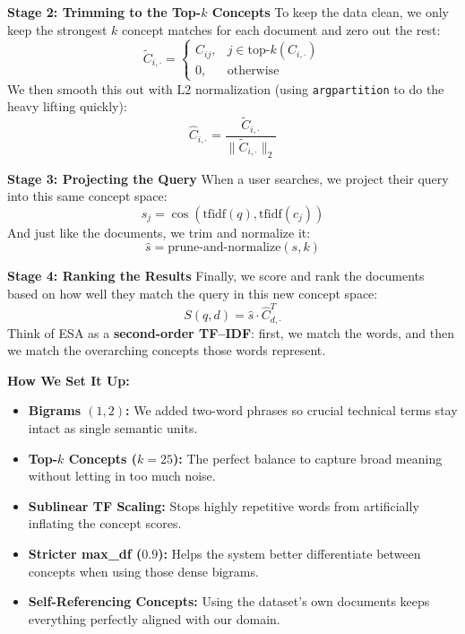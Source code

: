 \documentclass[runningheads]{llncs}
\begin{document}
\noindent\textbf{Stage 2: Trimming to the Top-$k$ Concepts}
To keep the data clean, we only keep the strongest $k$ concept matches for each document and zero out the rest:
\begin{equation}
\tilde{C}_{i,\cdot} =
\begin{cases}
C_{ij}, & j \in \text{top-}k(C_{i,\cdot}) \\
0, & \text{otherwise}
\end{cases}
\end{equation}
We then smooth this out with L2 normalization (using \texttt{argpartition} to do the heavy lifting quickly):
\begin{equation}
\hat{C}_{i,\cdot}
=
\frac{
\tilde{C}_{i,\cdot}
}{
\|\tilde{C}_{i,\cdot}\|_2
}
\end{equation}

\noindent\textbf{Stage 3: Projecting the Query}
When a user searches, we project their query into this same concept space:
\begin{equation}
s_j
=
\cos\left(
\text{tfidf}(q),
\text{tfidf}(c_j)
\right)
\end{equation}
And just like the documents, we trim and normalize it:
\begin{equation}
\hat{s}
=
\text{prune-and-normalize}(s,k)
\end{equation}

\noindent\textbf{Stage 4: Ranking the Results}
Finally, we score and rank the documents based on how well they match the query in this new concept space:
\begin{equation}
S(q,d)
=
\hat{s}
\cdot
\hat{C}_{d,\cdot}^{T}
\end{equation}
Think of ESA as a \textbf{second-order TF--IDF}: first, we match the words, and then we match the overarching concepts those words represent.

\textbf{How We Set It Up:}
\begin{itemize}
    \item \textbf{Bigrams $(1,2)$:} We added two-word phrases so crucial technical terms stay intact as single semantic units.
    \item \textbf{Top-$k$ Concepts ($k = 25$):} The perfect balance to capture broad meaning without letting in too much noise.
    \item \textbf{Sublinear TF Scaling:} Stops highly repetitive words from artificially inflating the concept scores.
    \item \textbf{Stricter max\_df ($0.9$):} Helps the system better differentiate between concepts when using those dense bigrams.
    \item \textbf{Self-Referencing Concepts:} Using the dataset's own documents keeps everything perfectly aligned with our domain.
\end{itemize}
\end{document}
